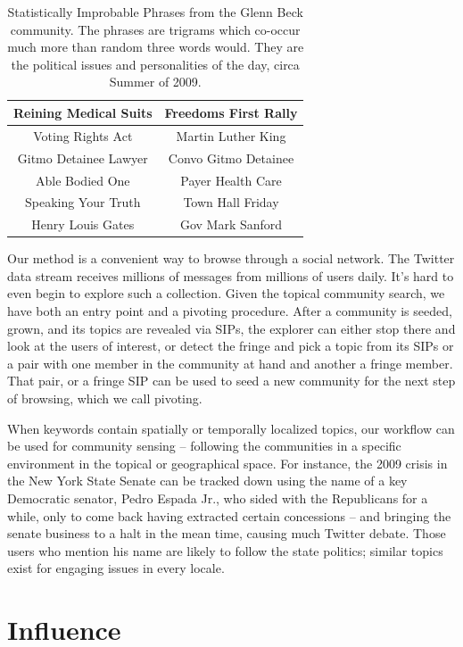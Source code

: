 \documentclass[10pt,oneside]{memoir}
\begin{document}
\begin{table}
\label{table:gb-sips}
    \centering
\begin{tabular}{|c|c|}
    \hline
    Reining Medical Suits & Freedoms First Rally \\
    \hline
    Voting Rights Act & Martin Luther King \\
    \hline
    Gitmo Detainee Lawyer & Convo Gitmo Detainee \\
    \hline
    Able Bodied One & Payer Health Care \\
    \hline
    Speaking Your Truth & Town Hall Friday \\
    \hline
    Henry Louis Gates & Gov Mark Sanford \\
    \hline 
\end{tabular}
\caption{Statistically Improbable Phrases from the Glenn Beck community.  The phrases are trigrams which co-occur much more than random three words would.  They are the political issues and personalities of the day, circa Summer of 2009.}
\end{table}
Our method is a convenient way to browse through a social network.
The Twitter data stream receives millions of messages from millions
of users daily. It's hard to even begin to explore such a
collection. Given the topical community search, we have both an
entry point and a pivoting procedure. After a community is seeded,
grown, and its topics are revealed via SIPs, the explorer can
either stop there and look at the users of interest, or detect the
fringe and pick a topic from its SIPs or a pair with one member in
the community at hand and another a fringe member. That pair, or a
fringe SIP can be used to seed a new community for the next step of
browsing, which we call pivoting.


When keywords contain spatially or temporally localized topics, our
workflow can be used for community sensing -- following the
communities in a specific environment in the topical or
geographical space. For instance, the 2009 crisis in the New York
State Senate can be tracked down using the name of a key Democratic
senator, Pedro Espada Jr., who sided with the Republicans for a
while, only to come back having extracted certain concessions -- and
bringing the senate business to a halt in the mean time, causing
much Twitter debate. Those users who mention his name are likely to
follow the state politics; similar topics exist for engaging issues
in every locale.


\pagebreak \chapter{Influence}
\label{influence}
\end{document}
